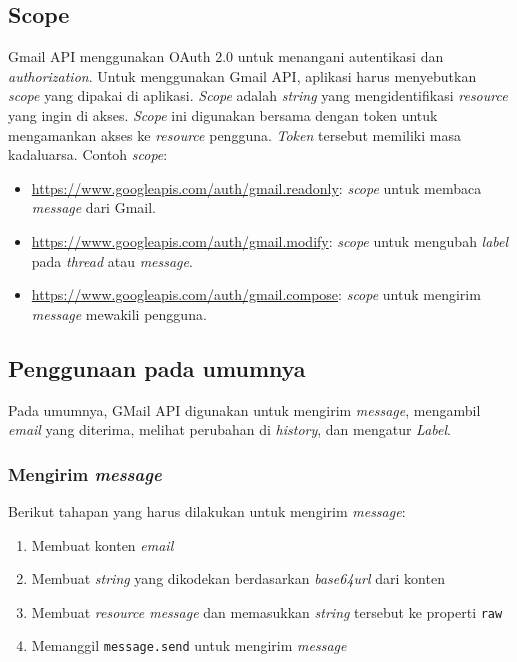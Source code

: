 \subsection{Scope}
Gmail API menggunakan OAuth 2.0 untuk menangani autentikasi dan \textit{authorization}. Untuk menggunakan Gmail API, aplikasi harus menyebutkan \textit{scope} yang dipakai di aplikasi. \textit{Scope} adalah \textit{string} yang mengidentifikasi \textit{resource} yang ingin di akses. \textit{Scope} ini digunakan bersama dengan token untuk mengamankan akses ke \textit{resource} pengguna. \textit{Token} tersebut memiliki masa kadaluarsa. Contoh \textit{scope}:
\begin{itemize}
\item \url{https://www.googleapis.com/auth/gmail.readonly}: \textit{scope} untuk membaca \textit{message} dari Gmail.
\item \url{https://www.googleapis.com/auth/gmail.modify}: \textit{scope} untuk mengubah \textit{label} pada \textit{thread} atau \textit{message}.
\item \url{https://www.googleapis.com/auth/gmail.compose}: \textit{scope} untuk mengirim \textit{message} mewakili pengguna.
\end{itemize}

\subsection{Penggunaan pada umumnya}
Pada umumnya, GMail API digunakan untuk mengirim \textit{message}, mengambil \textit{email} yang diterima, melihat perubahan di \textit{history}, dan mengatur \textit{Label}.

\subsubsection{Mengirim \textit{message}}
Berikut tahapan yang harus dilakukan untuk mengirim \textit{message}:
\begin{enumerate}
\item Membuat konten \textit{email}
\item Membuat \textit{string} yang dikodekan berdasarkan \textit{base64url} dari konten
\item Membuat \textit{resource message} dan memasukkan \textit{string} tersebut ke properti \texttt{raw}
\item Memanggil \texttt{message.send} untuk mengirim \textit{message}
\end{enumerate}

